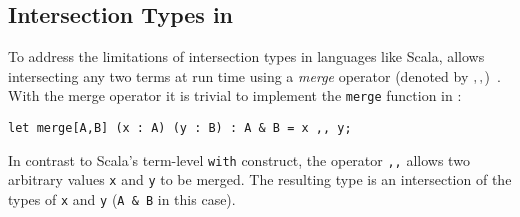

\subsection{Intersection Types in \name}


To address the limitations of intersection types in languages like
Scala, \name allows intersecting any two terms at run time using a
\emph{merge} operator (denoted by $ ,, $)~\cite{dunfield2014elaborating}.  With the merge
operator it is trivial to implement the \lstinline{merge} function in \name:

\begin{lstlisting}
let merge[A,B] (x : A) (y : B) : A & B = x ,, y;
\end{lstlisting}

\noindent In contrast to Scala's term-level \lstinline{with}
construct, the operator \lstinline{,,} allows two arbitrary values \lstinline{x}
and \lstinline{y} to be merged. The resulting type is an
intersection of the types of  \lstinline{x}
and \lstinline{y} (\lstinline{A & B} in this case).

